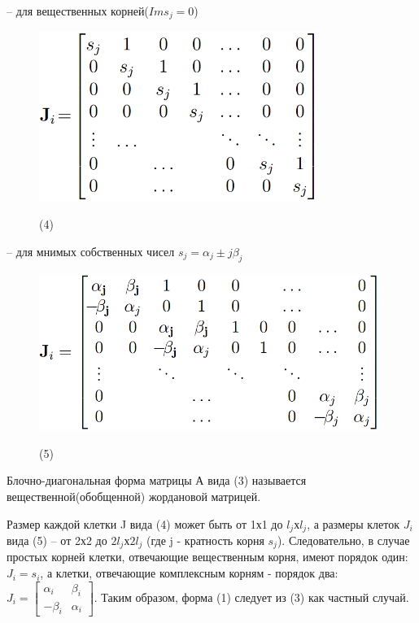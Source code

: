 \documentclass[12pt,a4paper,oneside]{article}
\begin{document}
-- для вещественных корней($Ims_j=0$)
\begin{figure}[H]
	\centering
	\begin{minipage}{.4\textwidth}
		\centering
		\includegraphics[width=9cm]{Drawable/4}
	\end{minipage}%
	\begin{minipage}{.4\textwidth}
		\centering
		(4)
	\end{minipage}
\end{figure}
-- для мнимых собственных чисел $s_j=\alpha_j\pm j\beta_j$
\begin{figure}[H]
	\centering
	\begin{minipage}{.5\textwidth}
		\centering
		\includegraphics[width=11cm]{Drawable/5}
	\end{minipage}%
	\begin{minipage}{.5\textwidth}
		\centering
		(5)
	\end{minipage}
\end{figure}
Блочно-диагональная форма матрицы А вида (3) называется вещественной(обобщенной) жордановой матрицей.

Размер каждой клетки J вида (4) может быть от 1х1 до $l_j$х$l_j$, а размеры клеток $J_i$ вида (5) -- от 2х2 до $2l_j$х$2l_j$ (где j - кратность корня $s_j$). Следовательно, в случае простых корней клетки, отвечающие вещественным корня, имеют порядок один: $J_i=s_i$, а клетки, отвечающие комплексным корням - порядок два: $J_i= \begin{bmatrix} \alpha_i & \beta_i  \\ -\beta_i & \alpha_i \end{bmatrix}$. Таким образом, форма (1) следует из (3) как частный случай.
\end{document}
